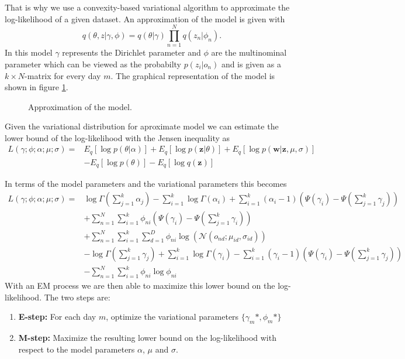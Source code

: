 \documentclass[11pt,a4paper]{article}
\begin{document}
That is why we use a convexity-based variational algorithm to approximate the log-likelihood of a given dataset. 
An approximation of the model is given with 
  \begin{equation}
   q(\theta,z|\gamma,\phi) = q(\theta|\gamma) \prod_{n=1}^N q(z_n|\phi_n).
  \end{equation}
In this model $\gamma$ represents the Dirichlet parameter and $\phi$ are the multinominal parameter which can be viewed as the probabilty $p(z_i|o_n)$ and is given as a $k \times N$-matrix for every day $m$. The graphical representation of the model is shown in figure \ref{fig:ModelApprox}.
  
 
\begin{figure}[h!]
\centering
\def\svgwidth{0.4\textwidth}

\caption{Approximation of the model.}
\label{fig:ModelApprox}
\end{figure}
 
  
  
  
  Given the variational distribution for aproximate model we can estimate the lower bound of the log-likelihood with the Jensen inequality as
  \begin{equation}
   \begin{split}
    L(\gamma;\phi;\alpha;\mu;\sigma) =& E_q[\log p(\theta|\alpha)] + E_q[\log p(\textbf{z}|\theta)] + E_q[\log p(\textbf{w}|\textbf{z},\mu,\sigma)] \\
   & -E_q[\log p(\theta)] - E_q[\log q(\textbf{z})]
   \end{split}
  \end{equation}

In terms of the model parameters and the variational parameters this becomes
\begin{equation}
  \begin{split}
 L(\gamma;\phi;\alpha;\mu;\sigma) =& \log \Gamma (\sum_{j=1}^k \alpha_j) - \sum_{i=1}^k \log \Gamma(\alpha_i) + \sum_{i=1}^k (\alpha_i-1)(\Psi(\gamma_i)-\Psi(\sum_{j=1}^k \gamma_j)) \\
 & + \sum_{n=1}^N \sum_{i=1}^k \phi_{ni} (\Psi(\gamma_i)-\Psi(\sum_{j=1}^k \gamma_i)) \\
  & + \sum_{n=1}^N \sum_{i=1}^k \sum_{d=1}^D \phi_{ni} \log( \mathcal{N}(o_{nd};\mu_{id},\sigma_{id})) \\
  & - \log \Gamma (\sum_{j=1}^k \gamma_j) + \sum_{i=1}^k \log \Gamma (\gamma_i) - \sum_{i=1}^k (\gamma_i -1)(\Psi(\gamma_i)-\Psi(\sum_{j=1}^k \gamma_j)) \\
 & - \sum_{n=1}^N \sum_{i=1}^k \phi_{ni} \log \phi_{ni}
  \end{split}
  \label{eq:likeli}
\end{equation}
With an EM process we are then able to maximize this lower bound on the log-likelihood. The two steps are:
  \begin{enumerate}
   \item \textbf{E-step:} For each day $m$, optimize the variational parameters $\{ \gamma_{m}*,\phi_{m}* \}$
   \item \textbf{M-step:} Maximize the resulting lower bound on the log-likelihood with respect to the model parameters $\alpha$, $\mu$ and $\sigma$.
  \end{enumerate}
  
\end{document}
